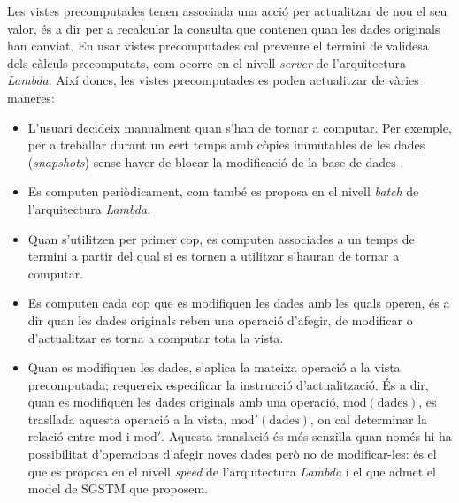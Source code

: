 Les vistes precomputades tenen associada una acció per actualitzar de
nou el seu valor, és a dir per a recalcular la consulta que contenen
quan les dades originals han canviat. En usar vistes precomputades cal
preveure el termini de validesa dels càlculs precomputats, com ocorre
en el nivell \emph{server} de l'arquitectura \emph{Lambda}. Així
doncs, les vistes precomputades es poden actualitzar de vàries
maneres:
\begin{itemize}

\item L'usuari decideix manualment quan s'han de tornar a computar. Per
  exemple, per a treballar durant un cert temps amb còpies immutables
  de les dades (\emph{snapshots}) sense haver de blocar la modificació
  de la base de dades \cite[\S{}10.5]{date04:introduction8}.

\item Es computen periòdicament, com també es proposa en el nivell
  \emph{batch} de l'arquitectura \emph{Lambda}.

\item Quan s'utilitzen per primer cop, es computen associades a un
  temps de termini a partir del qual si es tornen a utilitzar s'hauran
  de tornar a computar. 


\item Es computen cada cop que es modifiquen les dades amb les quals
  operen, és a dir quan les dades originals reben una operació
  d'afegir, de modificar o d'actualitzar es torna a computar tota la
  vista.

\item Quan es modifiquen les dades, s'aplica la mateixa operació a la
  vista precomputada; requereix especificar la instrucció
  d'actualització. És a dir, quan es modifiquen les dades originals
  amb una operació, $\text{mod}(\text{dades})$, es trasllada aquesta
  operació a la vista, $\text{mod}'(\text{dades})$, on cal determinar
  la relació entre $\text{mod}$ i $\text{mod}'$.  Aquesta translació
  és més senzilla quan només hi ha possibilitat d'operacions d'afegir
  noves dades però no de modificar-les: és el que es proposa en el
  nivell \emph{speed} de l'arquitectura \emph{Lambda} i el que admet
  el model de \gls{SGSTM} que proposem. 
\end{itemize}



